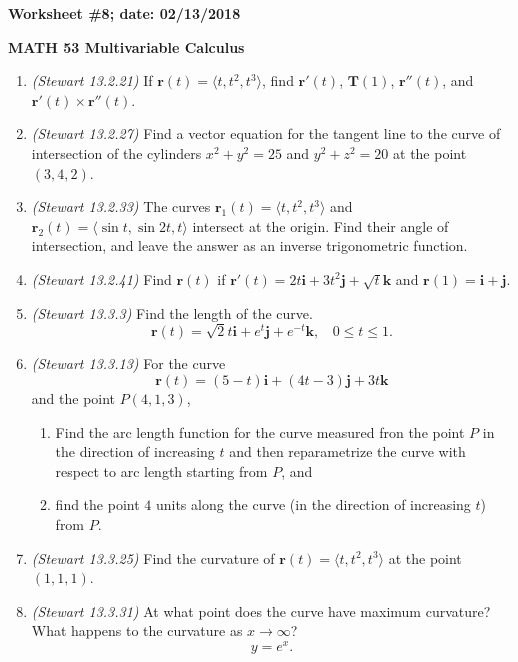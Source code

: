 \documentclass{article}
\newcommand{\ii}{\mathbf{i}}
\newcommand{\jj}{\mathbf{j}}
\newcommand{\kk}{\mathbf{k}}
\newcommand{\rr}{\mathbf{r}}
\newcommand{\TT}{\mathbf{T}}
\begin{document}
{\bf Worksheet \#8; date: 02/13/2018}

{\bf MATH 53 Multivariable Calculus}

\begin{enumerate}
\item {\em (Stewart 13.2.21)} If $\rr(t) = \langle t, t^2, t^3\rangle$, find $\rr'(t)$, $\TT(1)$, $\rr''(t)$, and $\rr'(t) \times \rr''(t)$.

\item {\em (Stewart 13.2.27)} Find a vector equation for the tangent line to the curve of intersection of the cylinders $x^2 + y^2 = 25$ and $y^2 + z^2 = 20$ at the point $(3, 4, 2)$.

\item {\em (Stewart 13.2.33)} The curves $\rr_1(t) = \langle t, t^2, t^3 \rangle$ and $\rr_2(t) = \langle \sin t, \sin 2t, t \rangle$ intersect at the origin. Find their angle of intersection, and leave the answer as an inverse trigonometric function.

\item {\em (Stewart 13.2.41)} Find $\rr(t)$ if $\rr'(t) = 2t \ii + 3t^2 \jj + \sqrt{t} \kk$ and $\rr(1) = \ii + \jj$.

\item {\em (Stewart 13.3.3)} Find the length of the curve.
\[
\rr(t) = \sqrt{2} t \ii + e^t \jj + e^{-t} \kk, ~~~~ 0 \le t \le 1.
\]

\item {\em (Stewart 13.3.13)} For the curve
\[
\rr(t) = (5-t) \ii + (4t - 3) \jj + 3t \kk
\]
and the point $P(4, 1, 3)$,
\begin{enumerate}
\item Find the arc length function for the curve measured fron the point $P$ in the direction of increasing $t$ and then reparametrize the curve with respect to arc length starting from $P$, and
\item find the point $4$ units along the curve (in the direction of increasing $t$) from $P$.
\end{enumerate}

\item {\em (Stewart 13.3.25)} Find the curvature of $\rr(t) = \langle t, t^2, t^3 \rangle$ at the point $(1, 1, 1)$.

\item {\em (Stewart 13.3.31)} At what point does the curve have maximum curvature? What happens to the curvature as $x \to \infty$?
\[
y = e^x.
\]
\end{enumerate}
\end{document}
